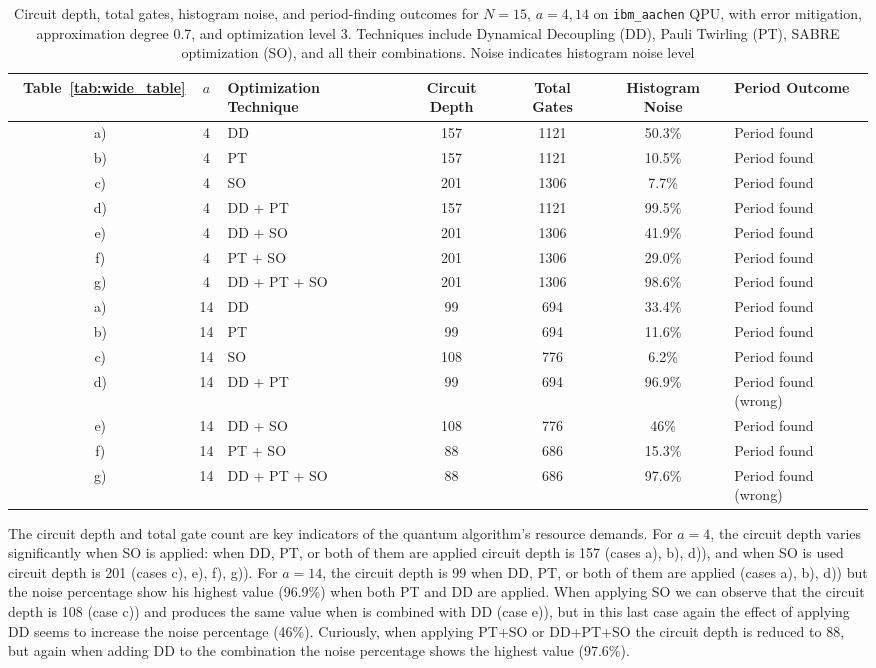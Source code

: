 \documentclass[conference,twoside]{IEEEtran}
\begin{document}
\begin{table}[h]
\centering
\caption{Circuit depth, total gates, histogram noise, and period-finding outcomes for $N=15$, $a=4, 14$ on \texttt{ibm\_aachen} QPU, with error mitigation, approximation degree 0.7, and optimization level 3. Techniques include Dynamical Decoupling (DD), Pauli Twirling (PT), SABRE optimization (SO), and all their combinations. Noise indicates histogram noise level}
\label{tab:Aachen_DD_PT_SABRE}
\begin{tabular}{c c l c c c l}
\toprule
\ Table~\ref{tab:wide_table} & $a$ & Optimization Technique & Circuit Depth & Total Gates & Histogram Noise & Period Outcome \\
\midrule
a) & 4 & DD & 157 & 1121 & 50.3\% & Period found \\
b) & 4 & PT & 157 & 1121 & 10.5\% & Period found \\
c) & 4 & SO & 201 & 1306 & 7.7\% & Period found \\
d) & 4 & DD + PT & 157 & 1121 & 99.5\% & Period found \\
e) & 4 & DD + SO & 201 & 1306 & 41.9\% & Period found \\
f) & 4 & PT + SO & 201 & 1306 & 29.0\% & Period found \\
g) & 4 & DD + PT + SO  & 201 & 1306 & 98.6\% & Period found \\
\midrule
a) & 14 & DD & 99 & 694 & 33.4\% & Period found \\
b) & 14 & PT & 99 & 694 & 11.6\% & Period found \\
c) & 14 & SO & 108 & 776 & 6.2\% & Period found \\
d) & 14 & DD + PT & 99 & 694 & 96.9\% & Period found (wrong) \\
e) & 14 & DD + SO & 108 & 776 & 46\% & Period found \\
f) & 14 & PT + SO & 88 & 686 & 15.3\% & Period found \\
g) & 14 & DD + PT + SO  & 88 & 686 & 97.6\% & Period found (wrong) \\
\bottomrule
\end{tabular}
\end{table}

The circuit depth and total gate count are key indicators of the quantum algorithm’s resource demands. For $a=4$, the circuit depth varies significantly when SO is applied: when DD, PT, or both of them are applied circuit depth is 157 (cases a), b), d)), and when SO is used circuit depth is 201 (cases c), e), f), g)). For $a=14$, the circuit depth is 99 when DD, PT, or both of them are applied (cases a), b), d)) but the noise percentage show his highest value (96.9\%) when both PT and DD are applied. When applying SO we can observe that the circuit depth is 108 (case c)) and produces the same value when is combined with DD (case e)), but in this last case again the effect of applying DD seems to increase the noise percentage (46\%). Curiously, when applying PT+SO or DD+PT+SO the circuit depth is reduced to 88, but again when adding DD to the combination the noise percentage shows the highest value (97.6\%).   
\end{document}

